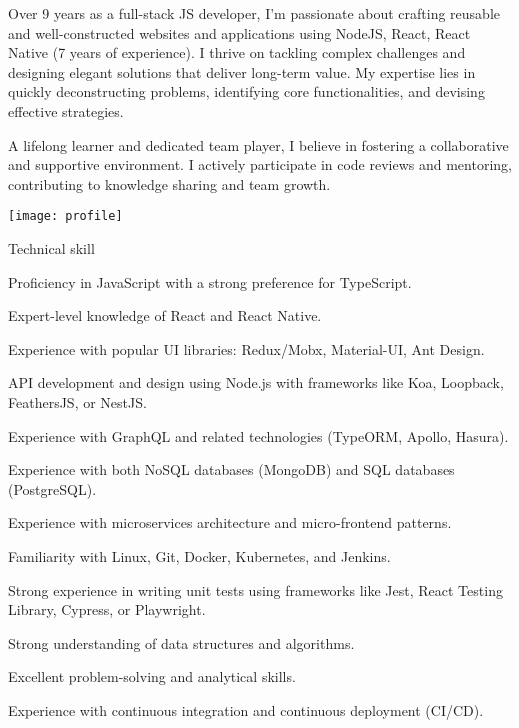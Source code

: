 \documentclass{resume}
\begin{document}

  \noindent\begin{minipage}{0.8\textwidth}%
    Over 9 years as a full-stack JS developer, I'm passionate about crafting reusable and well-constructed websites and applications 
    using NodeJS, React, React Native (7 years of experience). 
    I thrive on tackling complex challenges and designing elegant solutions that deliver long-term value. 
    My expertise lies in quickly deconstructing problems, identifying core functionalities, and devising effective strategies.\newline

    A lifelong learner and dedicated team player, I believe in fostering a collaborative and supportive environment. 
    I actively participate in code reviews and mentoring,  contributing to knowledge sharing and team growth.\newline
    \end{minipage}%
    \hfill%
    \begin{minipage}{0.1\textwidth}\raggedright
      \texttt{[image: profile]}
    \end{minipage}

  \begin{rSection}{Technical skill}
    \begin{rSubsection}{}{}{}{}
      \item Proficiency in JavaScript with a strong preference for TypeScript.
      \item Expert-level knowledge of React and React Native.
      \item Experience with popular UI libraries: Redux/Mobx, Material-UI, Ant Design.
      \item API development and design using Node.js with frameworks like Koa, Loopback, FeathersJS, or NestJS.
      \item Experience with GraphQL and related technologies (TypeORM, Apollo, Hasura).
      \item Experience with both NoSQL databases (MongoDB) and SQL databases (PostgreSQL).
      \item Experience with microservices architecture and micro-frontend patterns.
      \item Familiarity with Linux, Git, Docker, Kubernetes, and Jenkins.
      \item Strong experience in writing unit tests using frameworks like Jest, React Testing Library, Cypress, or Playwright.
      \item Strong understanding of data structures and algorithms.
      \item Excellent problem-solving and analytical skills.
      \item Experience with continuous integration and continuous deployment (CI/CD).
    \end{rSubsection}
  \end{rSection}
  
\end{document}
